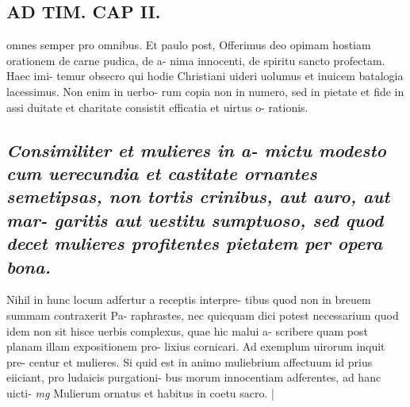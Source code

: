 \documentclass{article}
\begin{document}
\begin{pages}
\section*{AD TIM. CAP II. }
\marginpar{[ p.119 ]}\pstart omnes semper pro omnibus. Et paulo post, Offerimus deo opimam hostiam orationem de carne pudica, de a- nima innocenti, de spiritu sancto profectam. Haec imi- temur obsecro qui hodie Christiani uideri uolumus et inuicem batalogia lacessimus. Non enim in uerbo- rum copia non in numero, sed in pietate et fide in assi duitate et charitate consistit efficatia et uirtus o- rationis.  \pend
{}
{}
\subsection*{\textit{Consimiliter et mulieres in a- mictu modesto cum uerecundia et castitate ornantes semetipsas, non tortis crinibus, aut auro, aut mar- garitis aut uestitu sumptuoso, sed quod decet mulieres profitentes pietatem per opera bona. }}\pstart Nihil in hunc locum adfertur a receptis interpre- tibus quod non in breuem summam contraxerit Pa- raphrastes, nec quicquam dici potest necessarium quod idem non sit hisce uerbis complexus, quae hic malui a- scribere quam post planam illam expositionem pro- lixius cornicari. Ad exemplum uirorum inquit pre- centur et mulieres. Si quid est in animo muliebrium affectuum id prius eiiciant, pro ludaicis purgationi- bus morum innocentiam adferentes, ad hanc uicti-  \pend
\textit{mg}
\footnotesize Mulierum ornatus et habitus in coetu sacro. 
\normalsize| 

\end{pages}
\end{document}
